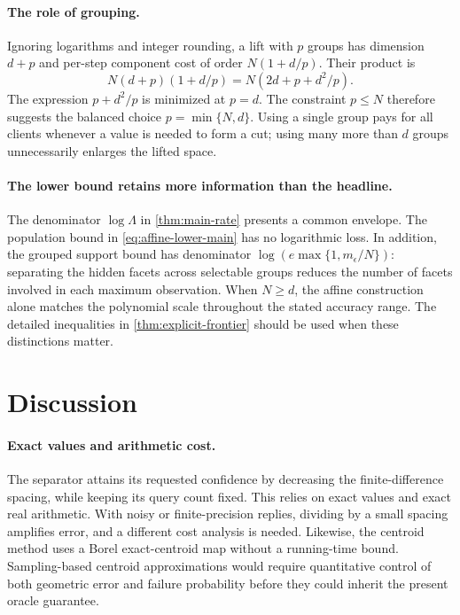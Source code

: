 \documentclass[11pt]{article}
\numberwithin{equation}{section}
\theoremstyle{remark}
\theoremstyle{definition}
\newcommand{\eps}{\epsilon}
\begin{document}
\paragraph{The role of grouping.}
Ignoring logarithms and integer rounding, a lift with $p$ groups has
dimension $d+p$ and per-step component cost of order
$N(1+d/p)$. Their product is
\begin{equation}
N(d+p)(1+d/p)=N(2d+p+d^2/p).
\label{eq:group-balance}
\end{equation}
The expression $p+d^2/p$ is minimized at $p=d$.
The constraint $p\le N$ therefore suggests the balanced choice
$p=\min\{N,d\}$. Using a single group pays for all clients whenever
a value is needed to form a cut; using many more than $d$ groups
unnecessarily enlarges the lifted space.

\paragraph{The lower bound retains more information than the headline.}
The denominator $\log\Lambda$ in \cref{thm:main-rate} presents a common
envelope. The population bound in
\eqref{eq:affine-lower-main} has no logarithmic loss. In addition,
the grouped support bound has denominator
$\log(e\max\{1,m_\eps/N\})$: separating the hidden facets across
selectable groups reduces the number of facets involved in each
maximum observation. When $N\ge d$, the affine construction alone
matches the polynomial scale throughout the stated accuracy range.
The detailed inequalities in \cref{thm:explicit-frontier} should be
used when these distinctions matter.

\section{Discussion}
\label{sec:discussion}

\paragraph{Exact values and arithmetic cost.}
The separator attains its requested confidence by decreasing the
finite-difference spacing, while keeping its query count fixed.
This relies on exact values and exact real arithmetic. With noisy or
finite-precision replies, dividing by a small spacing amplifies error,
and a different cost analysis is needed. Likewise, the centroid method
uses a Borel exact-centroid map without a running-time bound.
Sampling-based centroid approximations would require quantitative
control of both geometric error and failure probability before they
could inherit the present oracle guarantee.
\end{document}
